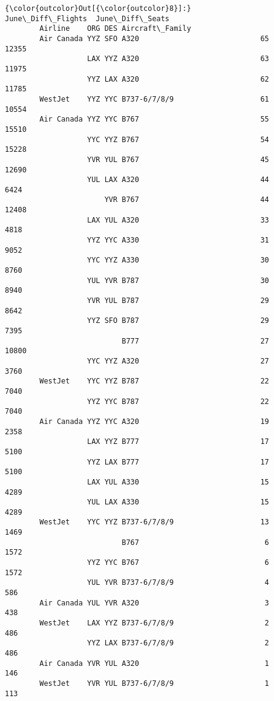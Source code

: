 \documentclass[11pt]{article}
\begin{document}
\begin{Verbatim}[commandchars=\\\{\}]
{\color{outcolor}Out[{\color{outcolor}8}]:}                                     June\_Diff\_Flights  June\_Diff\_Seats
        Airline    ORG DES Aircraft\_Family                                    
        Air Canada YYZ SFO A320                            65            12355
                   LAX YYZ A320                            63            11975
                   YYZ LAX A320                            62            11785
        WestJet    YYZ YYC B737-6/7/8/9                    61            10554
        Air Canada YYZ YYC B767                            55            15510
                   YYC YYZ B767                            54            15228
                   YVR YUL B767                            45            12690
                   YUL LAX A320                            44             6424
                       YVR B767                            44            12408
                   LAX YUL A320                            33             4818
                   YYZ YYC A330                            31             9052
                   YYC YYZ A330                            30             8760
                   YUL YVR B787                            30             8940
                   YVR YUL B787                            29             8642
                   YYZ SFO B787                            29             7395
                           B777                            27            10800
                   YYC YYZ A320                            27             3760
        WestJet    YYC YYZ B787                            22             7040
                   YYZ YYC B787                            22             7040
        Air Canada YYZ YYC A320                            19             2358
                   LAX YYZ B777                            17             5100
                   YYZ LAX B777                            17             5100
                   LAX YUL A330                            15             4289
                   YUL LAX A330                            15             4289
        WestJet    YYC YYZ B737-6/7/8/9                    13             1469
                           B767                             6             1572
                   YYZ YYC B767                             6             1572
                   YUL YVR B737-6/7/8/9                     4              586
        Air Canada YUL YVR A320                             3              438
        WestJet    LAX YYZ B737-6/7/8/9                     2              486
                   YYZ LAX B737-6/7/8/9                     2              486
        Air Canada YVR YUL A320                             1              146
        WestJet    YVR YUL B737-6/7/8/9                     1              113
\end{Verbatim}
            

    
    
    
    
\end{document}
